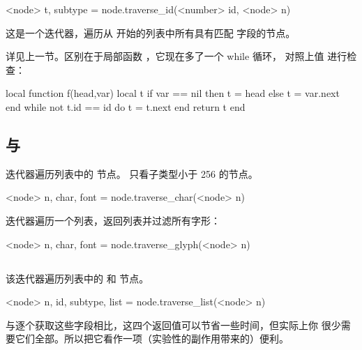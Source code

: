 
\begin{typing}
<node> t, subtype =
    node.traverse_id(<number> id, <node> n)
\end{typing}

这是一个迭代器，遍历从  开始的列表中所有具有匹配
 字段的节点。

详见上一节。区别在于局部函数 ，它现在多了一个 while 循环，
对照上值  进行检查：

\begin{typing}
 local function f(head,var)
   local t
   if var == nil then
      t = head
   else
      t = var.next
   end
   while not t.id == id do
      t = t.next
   end
   return t
 end
\end{typing}

\subsection{ 与 }


 迭代器遍历列表中的  节点。
只看子类型小于 256 的节点。

\begin{typing}
<node> n, char, font =
    node.traverse_char(<node> n)
\end{typing}

 迭代器遍历一个列表，返回列表并过滤所有字形：

\begin{typing}
<node> n, char, font =
    node.traverse_glyph(<node> n)
\end{typing}

\subsection{}


该迭代器遍历列表中的  和  节点。

\begin{typing}
<node> n, id, subtype, list =
    node.traverse_list(<node> n)
\end{typing}

与逐个获取这些字段相比，这四个返回值可以节省一些时间，但实际上你
很少需要它们全部。所以把它看作一项（实验性的副作用带来的）便利。


